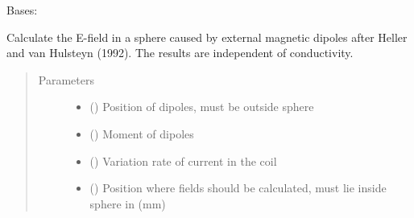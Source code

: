 \documentclass[letterpaper,10pt,english,openany,oneside]{sphinxmanual}
\begin{document}
\begin{fulllineitems}
\label{\detokenize{pygpc.testfunctions:pygpc.testfunctions.testfunctions.TMSEfieldSphere}}
Bases: {\hyperref[\detokenize{pygpc:pygpc.AbstractModel.AbstractModel}]{}}

Calculate the E-field in a sphere caused by external magnetic dipoles after Heller and van Hulsteyn (1992).
The results are independent of conductivity.
\begin{quote}\begin{description}
\item[{Parameters}] \leavevmode\begin{itemize}
\item {} 
\sphinxstyleliteralstrong{\sphinxupquote{{[}}}\sphinxstyleliteralstrong{\sphinxupquote{{]}}} (\sphinxstyleliteralemphasis{\sphinxupquote{ {[}}}\sphinxstyleliteralemphasis{\sphinxupquote{{]}}}) \textendash{} Position of dipoles, must be outside sphere

\item {} 
\sphinxstyleliteralstrong{\sphinxupquote{{[}}}\sphinxstyleliteralstrong{\sphinxupquote{{]}}} (\sphinxstyleliteralemphasis{\sphinxupquote{ {[}}}\sphinxstyleliteralemphasis{\sphinxupquote{{]}}}) \textendash{} Moment of dipoles

\item {} 
\sphinxstyleliteralstrong{\sphinxupquote{{[}}}\sphinxstyleliteralstrong{\sphinxupquote{{]}}} () \textendash{} Variation rate of current in the coil

\item {} 
\sphinxstyleliteralstrong{\sphinxupquote{{[}}}\sphinxstyleliteralstrong{\sphinxupquote{{]}}} (\sphinxstyleliteralemphasis{\sphinxupquote{ {[}}}\sphinxstyleliteralemphasis{\sphinxupquote{{]}}}) \textendash{} Position where fields should be calculated, must lie inside sphere in (mm)


\end{itemize}
\end{description}
\end{quote}
\end{fulllineitems}
\end{document}
